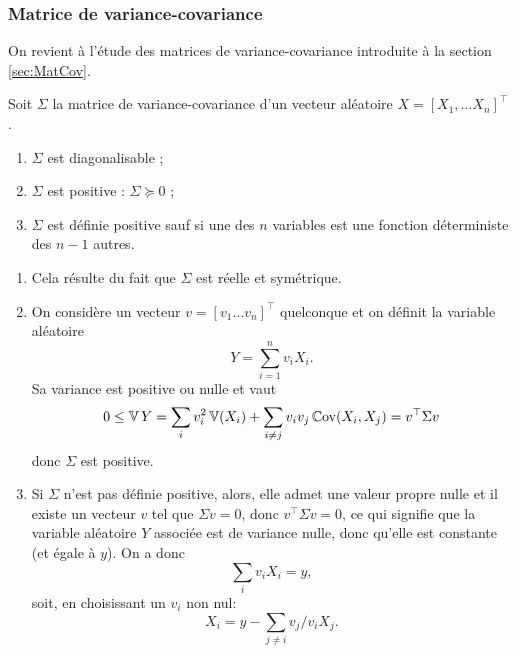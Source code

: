

\subsubsection{Matrice de variance-covariance}

On revient à l'étude des matrices de variance-covariance introduite à la section \ref{sec:MatCov}.

\begin{proposition}
  Soit $\Sigma$ la matrice de variance-covariance d'un vecteur aléatoire $X = [X_1, \dots X_n]^\top$.
  \begin{enumerate}
    \item $\Sigma$ est diagonalisable ;
    \item $\Sigma$ est positive : $\Sigma \succcurlyeq 0$ ;
    \item $\Sigma$ est définie positive sauf si une des $n$ variables est une fonction déterministe des $n-1$ autres.
  \end{enumerate}
\end{proposition}

\proof
\begin{enumerate}
\item Cela résulte du fait que $\Sigma$ est réelle et symétrique.
\item On considère un vecteur $v = [v_1 \dots v_n]^\top$ quelconque et on définit la variable aléatoire 
$$
Y = \sum_{i=1}^n v_i X_i.
$$
Sa variance est positive ou nulle et vaut
$$
0 \leq \operatorname{\mathbb{V}} Y 
= \sum_i v_i^2 \operatorname{\mathbb{V}}(X_i) + \sum_{i \neq j} v_i v_j \operatorname{\mathbb{C}ov}(X_i, X_j)
= v^\top \Sigma v
$$
donc $\Sigma$ est positive.
\item Si $\Sigma$  n'est pas définie positive, alors, elle admet une valeur propre nulle et il existe un vecteur $v$ tel que $\Sigma v = 0$, donc $v^\top \Sigma v = 0$, ce qui signifie que la variable aléatoire $Y$ associée est de variance nulle, donc qu'elle est constante (et égale à $y$). On a donc
$$
\sum_i v_i X_i = y,
$$
soit, en choisissant un $v_i$ non nul: 
$$
X_i = y - \sum_{j \neq i} v_j/v_i X_j.
$$
\end{enumerate}
\eproof

